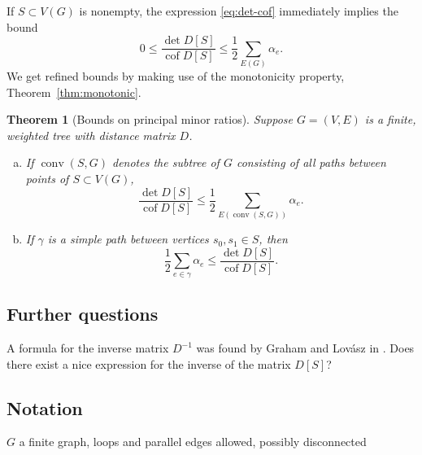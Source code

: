 \documentclass{amsart}
\newtheorem{thm}{Theorem}
\newtheorem{cor}[thm]{Corollary}
\theoremstyle{definition}
\DeclareMathOperator{\cof}{cof}
\DeclareMathOperator{\conv}{conv}
\begin{document}
If $S \subset V(G)$ is nonempty,
the expression \eqref{eq:det-cof} immediately implies the bound
\begin{equation*}
0 \leq \frac{\det D[S]}{\cof D[S]} \leq \frac12 \sum_{E(G)} \alpha_e .
\end{equation*}
We get refined bounds by making use of the monotonicity property, Theorem~\ref{thm:monotonic}.

\begin{thm}[Bounds on principal minor ratios]
\label{thm:det-cof-bounds}
Suppose $G = (V,E)$ is a finite, weighted tree with distance matrix $D$.
\begin{enumerate}[(a)]
\item 
If $\conv(S,G)$ denotes the subtree of $G$ consisting of all paths between points of $S \subset V(G)$,
\begin{equation*}
 \frac{\det D[S]}{\cof D[S]} \leq \frac12 \sum_{E(\conv(S, G))} \alpha_e .
\end{equation*}

\item 
If $\gamma$ is a simple path between vertices $s_0, s_1 \in S$, then
\begin{equation*}
	\frac12 \sum_{e \in \gamma} \alpha_e \leq \frac{\det D[S]}{\cof D[S]}.
\end{equation*}
\end{enumerate}
\end{thm}


\subsection{Further questions} 
A formula for the inverse matrix $D^{-1}$ was found by Graham and Lov\'{a}sz in \cite{graham-lovasz}.
Does there exist a nice expression for the inverse of the matrix $D[S]$?

\subsection{Notation}


$G$ a finite graph, 
loops and parallel edges allowed,
possibly disconnected
\end{document}
